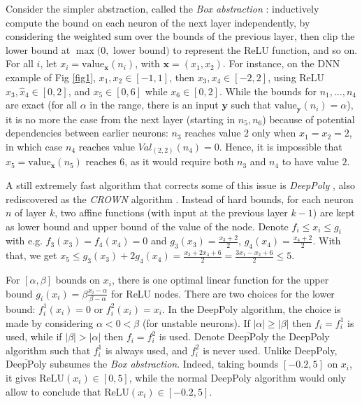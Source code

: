 \documentclass{llncs}
\newcommand{\vx}{\boldsymbol{x}}
\newcommand{\vy}{\boldsymbol{y}}
\newcommand{\val}{{\textrm{value}}}
\newcommand{\Val}{{\textrm{value}}}
\newcommand{\ReLU}{\mathrm{ReLU}}
\begin{document}
Consider the simpler abstraction, called the {\em Box abstraction} \cite{deeppoly}: inductively compute the bound on each neuron of the next layer independently, by considering the weighted sum over the bounds of the previous layer, then clip the lower bound at 
$\max(0,$ lower bound$)$ to represent the ReLU function, and so on.
For all $i$, let $x_i=\val_{\vx}(n_i)$, with $\vx=(x_1,x_2)$.
For instance, on the DNN example of Fig \ref{fig1}, $x_1,x_2 \in [-1,1]$, then $x_3,x_4 \in [-2,2]$, using ReLU $\hat{x}_3,\hat{x}_4 \in [0,2]$, and $x_5 \in [0,6]$ while $x_6 \in [0,2]$. 
While the bounds for $n_1, \ldots, n_4$ are exact (for all $\alpha$ 
in the range, there is an input $\vy$ such that $\val_{\vy}(n_i)=\alpha$), 
it is no more the case from the next layer (starting in $n_5,n_6$) because of potential 
dependencies between earlier neurons: $n_3$ reaches value $2$ only when $x_1=x_2=2$,
in which case $n_4$ reaches value $Val_{(2,2)}(n_4)=0$. Hence, it is impossible that $x_5=\Val_{\vx}(n_5)$ reaches $6$, as it would require both $n_3$ and $n_4$ to have value $2$.

A still extremely fast algorithm that corrects some of this issue is {\em DeepPoly} \cite{deeppoly}, also rediscovered as the {\em CROWN} algorithm \cite{crown}. Instead of 
hard bounds, for each neuron $n$ of layer $k$, two affine functions (with input at the previous layer $k-1$) are kept as lower bound and upper bound of the value of the node.
Denote $f_i \leq x_i \leq g_i$ with e.g.  
$f_{3}(x_3)=f_4(x_4)=0$ and 
$g_3(x_3) = \frac{x_3+2}{2}$,
$g_4(x_4) = \frac{x_4+2}{2}$. 
With that, we get 
$x_5 \leq g_3(x_3) + 2 g_4(x_4) = \frac{x_3 + 2x_4 + 6}{2} = \frac{3x_1 - x_2 + 6}{2}\leq 5$.

For $[\alpha,\beta]$ bounds on $x_i$, there is one optimal linear function for the upper bound $g_i(x_i)= \beta \frac{x_i-\alpha}{\beta-\alpha}$ for ReLU nodes.
There are two choices for the lower bound: $f^1_i(x_i) = 0$ or $f^2_i(x_i)=x_i$.
In the DeepPoly algorithm, the choice is made by considering $\alpha < 0 < \beta$ (for unstable neurons). If $|\alpha|\geq |\beta|$ then $f_i=f^1_i$ is used, while if $|\beta|>|\alpha|$ then $f_i=f^2_i$ is used. Denote {\em $\overline{\mbox{DeepPoly}}$} the DeepPoly algorithm such that $f^1_i$ is always used, and $f^2_i$ is never used. 
Unlike DeepPoly, {\em $\overline{\mbox{DeepPoly}}$} subsumes the {\em Box abstraction}. Indeed, taking bounds $[-0.2,5]$ on $x_i$, it gives $\ReLU(x_i) \in [0,5]$, 
while the normal DeepPoly algorithm would only allow to conclude that $\ReLU(x_i) \in [-0.2,5]$.
\end{document}

